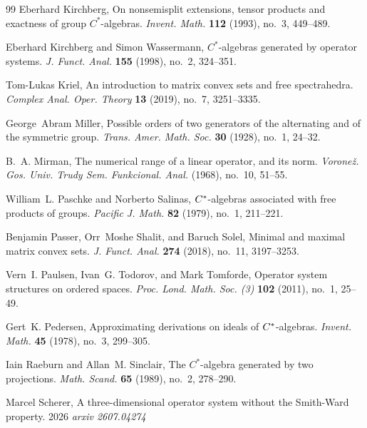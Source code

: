 \documentclass{amsart}
\theoremstyle{definition}
\theoremstyle{remark}
\numberwithin{equation}{section}
\begin{document}
\begin{thebibliography}{99}
Eberhard Kirchberg,  On nonsemisplit extensions, tensor products and
  exactness of group {$C^*$}-algebras. \emph{Invent. Math.} \textbf{112} (1993),
  no.~3, 449--489. %

Eberhard Kirchberg and Simon Wassermann, {$C^\ast$}-algebras generated by
  operator systems. \emph{J. Funct. Anal.} \textbf{155} (1998), no.~2, 324--351.

Tom-Lukas Kriel, An introduction to matrix convex sets and free
  spectrahedra. \emph{Complex Anal. Oper. Theory} \textbf{13} (2019), no.~7,
  3251--3335. %

George~Abram Miller,  Possible orders of two generators of the alternating
  and of the symmetric group. \emph{Trans. Amer. Math. Soc.} \textbf{30} (1928),
  no.~1, 24--32. %

B.~A. Mirman, The numerical range of a linear operator, and its norm.
\emph{Vorone\v z. Gos. Univ. Trudy Sem. Funkcional. Anal.} (1968), no.~10, 51--55.

William~L. Paschke and Norberto Salinas,  {$C\sp{\ast} $}-algebras
  associated with free products of groups. \emph{Pacific J. Math.} \textbf{82}
  (1979), no.~1, 211--221. %

Benjamin Passer, Orr~Moshe Shalit, and Baruch Solel,  Minimal and maximal
  matrix convex sets. \emph{J. Funct. Anal.} \textbf{274} (2018), no.~11, 3197--3253.

Vern~I. Paulsen, Ivan~G. Todorov, and Mark Tomforde,  Operator system
  structures on ordered spaces. \emph{Proc. Lond. Math. Soc. (3)} \textbf{102}
  (2011), no.~1, 25--49. %

Gert~K. Pedersen,  Approximating derivations on ideals of
  {$C\sp*$}-algebras. \emph{Invent. Math.} \textbf{45} (1978), no.~3, 299--305.

Iain Raeburn and Allan~M. Sinclair, The {$C^*$}-algebra generated by two
  projections. \emph{Math. Scand.} \textbf{65} (1989), no.~2, 278--290. %

Marcel Scherer,  A three-dimensional operator system without the
  {S}mith-{W}ard property. 2026 \emph{arxiv 2607.04274}


\end{thebibliography}
\end{document}
